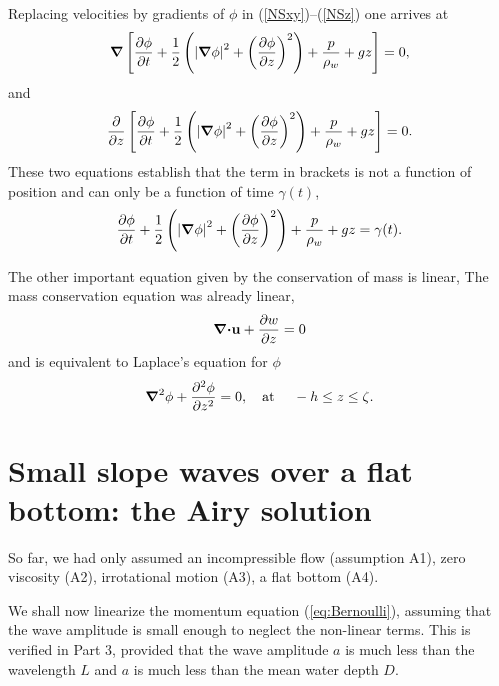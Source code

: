 Replacing velocities by gradients of $\phi$ in
(\ref{NSxy})--(\ref{NSz}) one arrives at
\begin{equation}
    \mbox{\boldmath $\nabla$} \left[\frac{\partial \phi}{\partial t}
    +\frac{1}{2}\left(
    \left|\mbox{\boldmath $\nabla$} \phi\right|^2
    +\left(\frac{\partial \phi}{\partial z}\right)^2
    \right)
    +\frac{p}{\rho_w}+gz \right]=0,
\end{equation}
and
\begin{equation}
    \frac{\partial}{\partial z} \left[\frac{\partial \phi}{\partial t}
    +\frac{1}{2}\left(
    \left|\mbox{\boldmath $\nabla$} \phi\right|^2
    +\left(\frac{\partial \phi}{\partial z}\right)^2
    \right)
    +\frac{p}{\rho_w}+gz \right]=0.\label{eq:NStoBer}
\end{equation}
These two equations establish that the term in brackets is not a function of position and can 
only be a function of time $\gamma(t)$, 
\begin{equation}
    \frac{\partial \phi}{\partial t}
    +\frac{1}{2}\left(
    \left|\mbox{\boldmath $\nabla$} \phi\right|^2
    +\left(\frac{\partial \phi}{\partial z}\right)^2
    \right)
    +\frac{p}{\rho_w}+gz =\gamma(t).\label{eq:Bernoulli}
\end{equation}

The other important equation given by the conservation of mass is linear, 
The mass conservation equation was already linear, 
\begin{equation}
\mbox{\boldmath $\nabla$} \mbox{\boldmath $\cdot$} {\mathbf u} + \frac{\partial w}{\partial z} =0
\end{equation}
and is equivalent to Laplace's equation for $\phi$
\begin{equation}
    \mbox{\boldmath $\nabla$}^2 \phi + \frac{\partial^2 \phi}{\partial z^2}=0,
    \quad \mbox{at\ }\quad -h\leq z \leq \zeta. \label{Laplace}
\end{equation}


\section{Small slope waves over a flat bottom: the Airy solution}
So far, we had only assumed an incompressible flow (assumption A1), zero viscosity (A2), 
irrotational motion (A3), a flat bottom (A4). 


We shall now linearize the momentum equation (\ref{eq:Bernoulli}), assuming that the wave amplitude is small enough to 
neglect the non-linear terms. This is verified in Part 3, provided that 
the wave amplitude $a$ is much less than the wavelength $L$ and $a$ is much less than the mean water depth $D$. 


